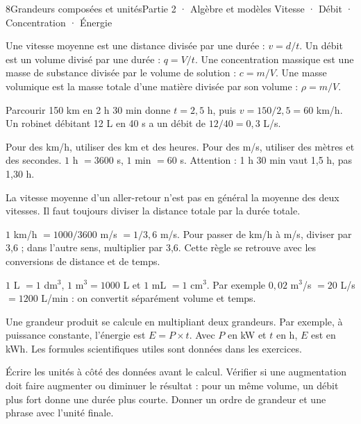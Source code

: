 \begin{ouverture}[calcul]{8}{Grandeurs composées et unités}{Partie 2 · Algèbre et modèles}
{Vitesse · Débit · Concentration · Énergie}
\end{ouverture}
\pagestyle{otMain}\essentiel\fontsize{11}{15}\selectfont
{}\label{cours-8-1}
\begin{definition}Une vitesse moyenne est une distance divisée par une durée : $v=d/t$. Un débit est un volume divisé par une durée : $q=V/t$. Une concentration massique est une masse de substance divisée par le volume de solution : $c=m/V$. Une masse volumique est la masse totale d’une matière divisée par son volume : $\rho=m/V$.\end{definition}
\begin{exemple}Parcourir 150 km en 2 h 30 min donne $t=2{,}5$ h, puis $v=150/2{,}5=60$ km/h. Un robinet débitant 12 L en 40 s a un débit de $12/40=0{,}3$ L/s.\end{exemple}
\begin{savoirfaire}Pour des km/h, utiliser des km et des heures. Pour des m/s, utiliser des mètres et des secondes. $1$ h $=3600$ s, $1$ min $=60$ s. Attention : 1 h 30 min vaut 1,5 h, pas 1,30 h.\end{savoirfaire}
\begin{attention}La vitesse moyenne d’un aller-retour n’est pas en général la moyenne des deux vitesses. Il faut toujours diviser la distance totale par la durée totale.\end{attention}
\clearpage
{}\label{cours-8-2}
\begin{propriete}$1$ km/h $=1000/3600$ m/s $=1/3{,}6$ m/s. Pour passer de km/h à m/s, diviser par 3,6 ; dans l’autre sens, multiplier par 3,6. Cette règle se retrouve avec les conversions de distance et de temps.\end{propriete}
\begin{propriete}$1$ L $=1$ dm$^3$, $1$ m$^3=1000$ L et $1$ mL $=1$ cm$^3$. Par exemple $0{,}02$ m$^3$/s $=20$ L/s $=1200$ L/min : on convertit séparément volume et temps.\end{propriete}
\begin{definition}Une grandeur produit se calcule en multipliant deux grandeurs. Par exemple, à puissance constante, l’énergie est $E=P\times t$. Avec $P$ en kW et $t$ en h, $E$ est en kWh. Les formules scientifiques utiles sont données dans les exercices.\end{definition}
\begin{savoirfaire}[Contrôler]Écrire les unités à côté des données avant le calcul. Vérifier si une augmentation doit faire augmenter ou diminuer le résultat : pour un même volume, un débit plus fort donne une durée plus courte. Donner un ordre de grandeur et une phrase avec l’unité finale.\end{savoirfaire}

